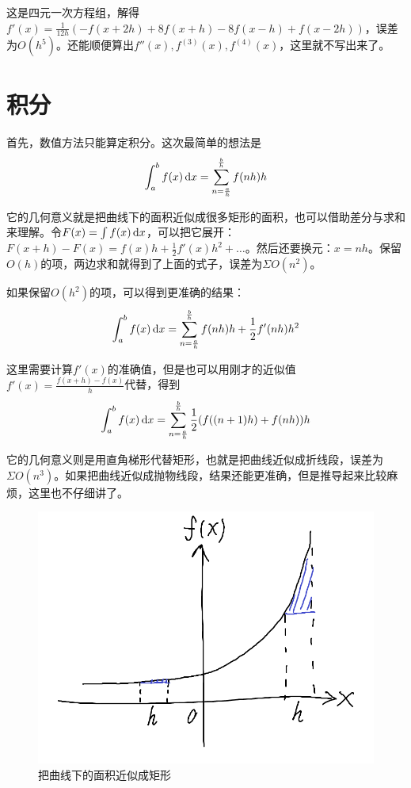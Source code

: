 这是四元一次方程组，解得$f'(x)=\frac{1}{12 h}(-f(x+2 h)+8 f(x+h)-8 f(x-h)+f(x-2 h))$，误差为$O(h^5)$。还能顺便算出$f''(x),f^{(3)}(x),f^{(4)}(x)$，这里就不写出来了。
\section{积分}
首先，数值方法只能算定积分。这次最简单的想法是
\begin{equation*}
\int_a^b f(x) \mathop{}\!\mathrm{d} x=\sum_{n=\frac{a}{h}}^{\frac{b}{h}} f(n h) h
\end{equation*}

它的几何意义就是把曲线下的面积近似成很多矩形的面积，也可以借助差分与求和来理解。令$F(x)=\int f(x) \mathop{}\!\mathrm{d} x$，可以把它展开：$F(x+h)-F(x)=f(x) h+\frac{1}{2} f'(x) h^2+\dots$。然后还要换元：$x=n h$。保留$O(h)$的项，两边求和就得到了上面的式子，误差为$\Sigma O(n^2)$。

如果保留$O(h^2)$的项，可以得到更准确的结果：
\begin{equation*}
\int_a^b f(x) \mathop{}\!\mathrm{d} x=\sum_{n=\frac{a}{h}}^{\frac{b}{h}} f(n h) h+\frac{1}{2} f'(n h) h^2
\end{equation*}

这里需要计算$f'(x)$的准确值，但是也可以用刚才的近似值$f'(x)=\frac{f(x+h)-f(x)}{h}$代替，得到
\begin{equation*}
\int_a^b f(x) \mathop{}\!\mathrm{d} x=\sum_{n=\frac{a}{h}}^{\frac{b}{h}} \frac{1}{2} (f((n+1) h)+f(n h)) h
\end{equation*}

它的几何意义则是用直角梯形代替矩形，也就是把曲线近似成折线段，误差为$\Sigma O(n^3)$。如果把曲线近似成抛物线段，结果还能更准确，但是推导起来比较麻烦，这里也不仔细讲了。
\begin{figure}[htb]
\centering
\includegraphics[scale=0.5]{fig/adjust-h.png}
\caption{把曲线下的面积近似成矩形}
\label{fig-adjust-h}
\end{figure}

